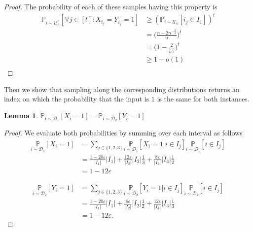 \documentclass[10pt,a4paper]{article}
\newtheorem{lemma}[theorem]{Lemma}
\newcommand{\sU}{\mathcal{U}}
\begin{document}
\begin{proof}
The probability of each of these samples having this property is 
\[
\begin{split}
    \mathbb{P}_{i\sim \sU_{n}^{t}}\left [\forall j\in [t]: X_{i_j}=Y_{i_j}=1\right ] &\geq (\mathbb{P}_{i\sim \sU_{n}}\left [i_j\in I_{1}\right ])^{t}\\
    &=\bigg(\frac{n-2n^{-\frac{2}{3}}}{n}\bigg)^{t}\\
    &=\bigg(1-\frac{2}{n^{\frac{1}{3}}}\bigg)^{t}\\
    &\geq 1-o(1)\\
\end{split}
\]
\end{proof}

Then we show that sampling along the corresponding distributions returns an index on which the probability that the input is $1$ is the same for both instances. 
\begin{lemma}\label{dsamps}
$\mathbb{P}_{i\sim \mathcal{D}_{1}}\left [X_{i}=1\right ]=\mathbb{P}_{i\sim \mathcal{D}_{2}}\left [Y_{i}=1\right ]$
\end{lemma}

\begin{proof}
We evaluate both probabilities by summing over each interval as follows
\[
\begin{split}
\underset{i\sim \mathcal{D}_{1}}{\mathbb{P}}\left [X_{i}=1\right ]&=\sum_{j\in\{1,2,3\}}\underset{i\sim \mathcal{D}_{1}}{\mathbb{P}}\left [X_{i}=1\vert i\in I_{j}\right ]\underset{i\sim \mathcal{D}_{1}}{\mathbb{P}}\left [i\in I_{j}\right ]\\
&=\frac{1-20\varepsilon}{|I_{1}|}|I_{1}|+\frac{12\varepsilon}{|I_{2}|}|I_{2}|\frac{1}{3}+\frac{8\varepsilon}{|I_{3}|}|I_{3}|\frac{1}{2}\\
&=1-12\varepsilon
\end{split}
\]

\[
\begin{split}
\underset{i\sim \mathcal{D}_{2}}{\mathbb{P}}\left [Y_{i}=1\right ]&=\sum_{j\in\{1,2,3\}}\underset{i\sim \mathcal{D}_{2}}{\mathbb{P}}\left [Y_{i}=1\vert i\in I_{j}\right ]\underset{i\sim \mathcal{D}_{2}}{\mathbb{P}}\left [i\in I_{j}\right]\\
&=\frac{1-20\varepsilon}{|I_{1}|}|I_{1}|+\frac{8\varepsilon}{|I_{2}|}|I_{2}|\frac{1}{2}+\frac{12\varepsilon}{|I_{3}|}|I_{3}|\frac{1}{3}\\
&=1-12\varepsilon.
\end{split}
\]
\end{proof}
\end{document}
